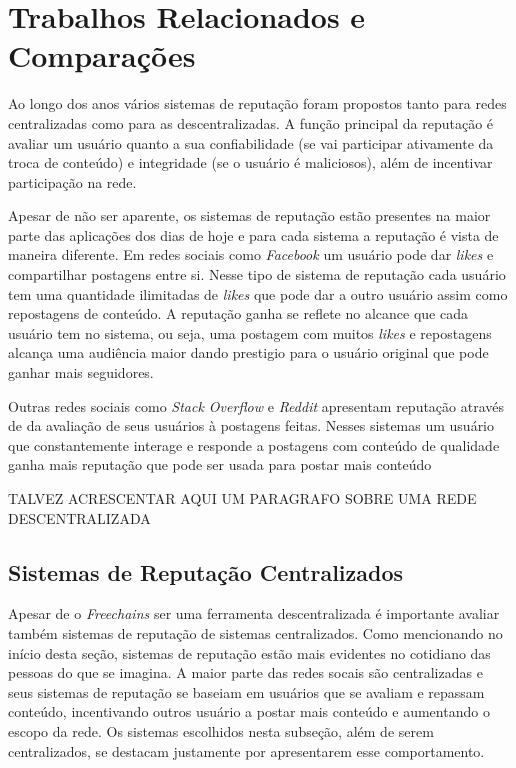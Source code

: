\documentclass[12pt]{article}
\newcommand{\FC} {\textit{Freechains}\xspace}
\begin{document}
\section{Trabalhos Relacionados e Comparações} \label{sec:trabrec}

Ao longo dos anos vários sistemas de reputação foram propostos tanto para redes centralizadas como para as descentralizadas. 
A função principal da reputação é avaliar um usuário quanto a sua confiabilidade (se vai participar ativamente da troca de conteúdo) e integridade (se o usuário é maliciosos), além de incentivar participação na rede. 

Apesar de não ser aparente, os sistemas de reputação estão presentes na maior parte das aplicações dos dias de hoje e para cada sistema a reputação é vista de maneira diferente. 
Em redes sociais como \textit{Facebook} um usuário pode dar \textit{likes} e compartilhar postagens entre si.
Nesse tipo de sistema de reputação cada usuário tem uma quantidade ilimitadas de \textit{likes} que pode dar a outro usuário assim como repostagens de conteúdo.
A reputação ganha se reflete no alcance que cada usuário tem no sistema, ou seja, uma postagem com muitos \textit{likes} e repostagens alcança uma audiência maior dando prestigio para o usuário original que pode ganhar mais seguidores.

Outras redes sociais como \textit{Stack Overflow} e \textit{Reddit} apresentam reputação através de da avaliação de seus usuários à postagens feitas.
Nesses sistemas um usuário que constantemente interage e responde a postagens com conteúdo de qualidade ganha mais reputação que pode ser usada para postar mais conteúdo 

TALVEZ ACRESCENTAR AQUI UM PARAGRAFO SOBRE UMA REDE DESCENTRALIZADA

\subsection{Sistemas de Reputação Centralizados} \label{subsec:SRCentra}

Apesar de o \FC ser uma ferramenta descentralizada é importante avaliar também sistemas de reputação de sistemas centralizados. 
Como mencionando no início desta seção, sistemas de reputação estão mais evidentes no cotidiano das pessoas do que se imagina. 
A maior parte das redes socais são centralizadas e seus sistemas de reputação se baseiam em usuários que se avaliam e repassam conteúdo, incentivando outros usuário a postar mais conteúdo e aumentando o escopo da rede.
Os sistemas escolhidos nesta subseção, além de serem centralizados, se destacam justamente por apresentarem esse comportamento.
\end{document}
